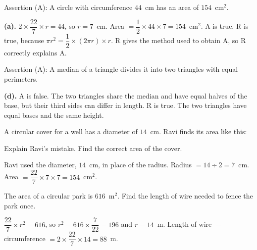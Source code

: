 \ques Assertion (A): A circle with circumference $44$~cm has an area of $154$~cm$^2$.\par
{}
\begin{answerblock}
\textbf{(a).}\nl
$2\times\dfrac{22}{7}\times r=44$, so $r=7$~cm. Area $=\dfrac12\times44\times7=154$~cm$^2$. A is true.\nl
R is true, because $\pi r^2=\dfrac12\times(2\pi r)\times r$. R gives the method used to obtain A, so R correctly explains A.
\end{answerblock}

\ques Assertion (A): A median of a triangle divides it into two triangles with equal perimeters.\par
{}
\begin{answerblock}
\textbf{(d).}\nl
A is false. The two triangles share the median and have equal halves of the base, but their third sides can differ in length.\nl
R is true. The two triangles have equal bases and the same height.
\end{answerblock}


\ques A circular cover for a well has a diameter of $14$~cm. Ravi finds its area like this:\par
{}
\vspace{2pt}\noindent\hspace*{1.7em}Explain Ravi's mistake. Find the correct area of the cover.\par
\begin{answerblock}
Ravi used the diameter, $14$~cm, in place of the radius.\nl
Radius $=14\div2=7$~cm. Area $=\dfrac{22}{7}\times7\times7=154$~cm$^2$.
\end{answerblock}

\ques The area of a circular park is $616$~m$^2$. Find the length of wire needed to fence the park once.\par
\begin{answerblock}
$\dfrac{22}{7}\times r^2=616$, so $r^2=616\times\dfrac{7}{22}=196$ and $r=14$~m.\nl
Length of wire $=$ circumference $=2\times\dfrac{22}{7}\times14=88$~m.
\end{answerblock}

